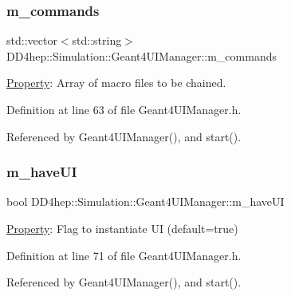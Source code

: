 \subsubsection{\texorpdfstring{m\+\_\+commands}{m\_commands}}
{\footnotesize\ttfamily std\+::vector$<$std\+::string$>$ D\+D4hep\+::\+Simulation\+::\+Geant4\+U\+I\+Manager\+::m\+\_\+commands\hspace{0.3cm}{\ttfamily [protected]}}



\hyperlink{class_d_d4hep_1_1_property}{Property}\+: Array of macro files to be chained. 



Definition at line 63 of file Geant4\+U\+I\+Manager.\+h.



Referenced by Geant4\+U\+I\+Manager(), and start().

\hypertarget{class_d_d4hep_1_1_simulation_1_1_geant4_u_i_manager_a3045697f75ed358629f23f9716775f29}{}\label{class_d_d4hep_1_1_simulation_1_1_geant4_u_i_manager_a3045697f75ed358629f23f9716775f29} 
\subsubsection{\texorpdfstring{m\+\_\+have\+UI}{m\_haveUI}}
{\footnotesize\ttfamily bool D\+D4hep\+::\+Simulation\+::\+Geant4\+U\+I\+Manager\+::m\+\_\+have\+UI\hspace{0.3cm}{\ttfamily [protected]}}



\hyperlink{class_d_d4hep_1_1_property}{Property}\+: Flag to instantiate UI (default=true) 



Definition at line 71 of file Geant4\+U\+I\+Manager.\+h.



Referenced by Geant4\+U\+I\+Manager(), and start().

\hypertarget{class_d_d4hep_1_1_simulation_1_1_geant4_u_i_manager_ae9d4d2c249167b2fb82ccec43d40000f}{}\label{class_d_d4hep_1_1_simulation_1_1_geant4_u_i_manager_ae9d4d2c249167b2fb82ccec43d40000f} 
